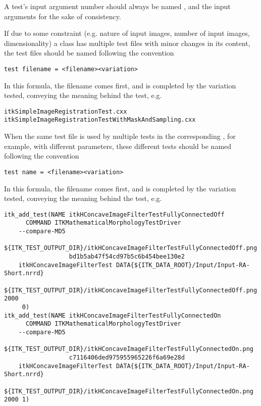 A test's input argument number should always be named , and the input
arguments  for the sake of consistency.

If due to some constraint (e.g. nature of input images, number of input images,
dimensionality) a class has multiple test files with minor changes in its
content, the test files should be named following the convention
\small
\begin{verbatim}
test filename = <filename><variation>
\end{verbatim}
\normalsize

In this formula, the filename comes first, and is completed by the variation
tested, conveying the meaning behind the test, e.g.
\small
\begin{verbatim}
itkSimpleImageRegistrationTest.cxx
itkSimpleImageRegistrationTestWithMaskAndSampling.cxx
\end{verbatim}
\normalsize

When the same test file is used by multiple tests in the corresponding
, for example, with different parameters, these different
tests should be named following the convention
\small
\begin{verbatim}
test name = <filename><variation>
\end{verbatim}
\normalsize

In this formula, the filename comes first, and is completed by the variation
tested, conveying the meaning behind the test, e.g.
\small
\begin{verbatim}
itk_add_test(NAME itkHConcaveImageFilterTestFullyConnectedOff
      COMMAND ITKMathematicalMorphologyTestDriver
    --compare-MD5
     ${ITK_TEST_OUTPUT_DIR}/itkHConcaveImageFilterTestFullyConnectedOff.png
                  bd1b5ab47f54cd97b5c6b454bee130e2
    itkHConcaveImageFilterTest DATA{${ITK_DATA_ROOT}/Input/Input-RA-Short.nrrd}
    ${ITK_TEST_OUTPUT_DIR}/itkHConcaveImageFilterTestFullyConnectedOff.png 2000
     0)
itk_add_test(NAME itkHConcaveImageFilterTestFullyConnectedOn
      COMMAND ITKMathematicalMorphologyTestDriver
    --compare-MD5
     ${ITK_TEST_OUTPUT_DIR}/itkHConcaveImageFilterTestFullyConnectedOn.png
                  c7116406ded975955965226f6a69e28d
    itkHConcaveImageFilterTest DATA{${ITK_DATA_ROOT}/Input/Input-RA-Short.nrrd}
     ${ITK_TEST_OUTPUT_DIR}/itkHConcaveImageFilterTestFullyConnectedOn.png 2000 1)
\end{verbatim}
\normalsize


